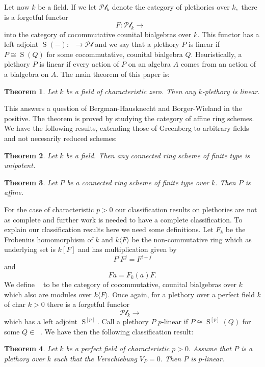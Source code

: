 \documentclass[a4paper, 12pt]{amsart}
\DeclareMathOperator{\Bialgk}{Bialg_k}
\DeclareMathOperator{\Bialgkp}{Bialg_k^p}
\DeclareMathOperator{\Sym}{S}
\numberwithin{equation}{section}
\newtheorem{theorem}{Theorem}[section]
\theoremstyle{definition}
\begin{document}
\noindent Let now $k$ be a field. If we let $\mathcal{Pl}_k$ denote the category of plethories over $k,$  there is a forgetful functor $$F:\mathcal{Pl}_k \rightarrow \Bialgk$$ into the category of cocommutative counital bialgebras over $k.$ This functor has a left adjoint $\Sym(-):\Bialgk \rightarrow \mathcal{Pl}$ and we say that a plethory $P$ is linear if $P \cong \Sym(Q)$ for some cocommutative, counital bialgebra $Q.$ Heuristically, a plethory $P$ is linear if every action of $P$ on an algebra $A$ comes from an action of a bialgebra on $A.$ The main theorem of this paper is: 
\begin{theorem}
Let $k$ be a field of characteristic zero. Then any $k$-plethory is linear.
\end{theorem} 
\noindent This answers a question of Bergman-Hausknecht \cite[p.336]{BergmanHaus} and Borger-Wieland \cite{BW} in the positive. The theorem is proved by studying the category of affine ring schemes. We have the following results, extending those of Greenberg \cite{Greenberg63} to arbitrary fields and not necesarily reduced schemes:
\begin{theorem}
Let $k$ be a field. Then any connected ring scheme of finite type is unipotent.
\end{theorem}
\begin{theorem}
Let $P$ be a connected ring scheme of finite type over $k.$ Then $P$ is affine. 
\end{theorem}
\noindent For the case of characteristic $p>0$ our classification results on plethories are not as complete and further work is needed to have a complete classification. To explain our classification results here we need some definitions. Let $F_k$ be the Frobenius homomorphism of $k$ and $k\langle F\rangle$ be the non-commutative ring which as underlying set is $k[F]$ and has multiplication given by $$F^i F^j = F^{i+j}$$ and $$Fa = F_k(a)F.$$ We define $\Bialgkp$ to be the category of cocommutative, counital bialgebras over $k$ which also are modules over $k \langle F \rangle.$ Once again, for a plethory over a perfect field $k$ of char $k>0$ there is a forgetful functor $$\mathcal{Pl}_k \rightarrow \Bialgkp$$ which has a left adjoint $\Sym^{[p]}.$ Call a plethory $P$ $p$-linear if $P \cong \Sym^{[p]}(Q)$ for some $Q \in \Bialgkp.$ We have then the following classification result:
\begin{theorem}
Let $k$ be a perfect field of characteristic $p>0.$ Assume that $P$ is a plethory over $k$ such that the Verschiebung $V_P=0.$ Then $P$ is $p$-linear.  
\end{theorem}
\end{document}
